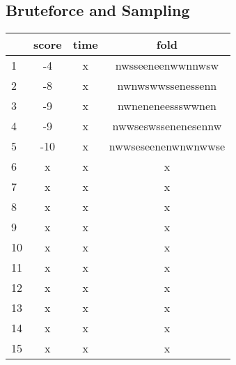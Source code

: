 \documentclass[a4paper,oneside,article,11pt]{memoir}
\begin{document}
\subsection*{Bruteforce and Sampling}
\begin{tabular}{l|c|c|c}
	& score & time	& fold \\\hline
1	& -4	& x		& nwsseeneenwwnnwsw	\\\hline
2	& -8	& x		& nwnwswwssenessenn	\\\hline
3	& -9	& x		& nwneneneessswwnen	\\\hline
4	& -9	& x		& nwwseswssenenesennw \\\hline
5	& -10	& x		& nwwseseenenwnwnwwse \\\hline
6	& x		& x		& x	\\\hline
7	& x		& x		& x	\\\hline
8	& x		& x		& x	\\\hline
9	& x		& x		& x	\\\hline
10	& x		& x		& x	\\\hline
11	& x		& x		& x	\\\hline
12	& x		& x		& x	\\\hline
13	& x		& x		& x	\\\hline
14	& x		& x		& x	\\\hline
15	& x		& x		& x	\\
\end{tabular}
\end{document}
